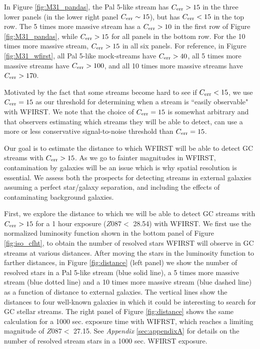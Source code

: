 \documentclass[twocolumn]{aastex62}
\begin{document}
In Figure \ref{fig:M31_pandas}, the Pal 5-like stream has $C_{\rm err} > 15$ in the three lower panels (in the lower right panel $C_{\rm err} \sim 15$), but has $C_{\rm err} <15$ in the top row. The 5 times more massive stream has a $C_{\rm err} > 10$ in the first row of Figure \ref{fig:M31_pandas}, while $C_{\rm err} > 15$ for all panels in the bottom row. For the 10 times more massive stream, $C_{\rm err} > 15$ in all six panels. For reference, in Figure \ref{fig:M31_wfirst}, all Pal 5-like mock-streams have $C_{\rm err} > 40$, all 5 times more massive streams have $C_{\rm err} > 100$, and all 10 times more massive streams have $C_{\rm err} > 170$.

Motivated by the fact that some streams become hard to see if $C_{\rm err} < 15$, we use $C_{\rm err} = 15$ as our threshold for determining when a stream is ``easily observable" with WFIRST. We note that the choice of $C_{\rm err} = 15$ is somewhat arbitrary and that observers estimating which streams they will be able to detect, can use a more or less conservative signal-to-noise threshold than $C_{\rm err} = 15$. 

Our goal is to estimate the distance to which WFIRST will be able to detect GC streams with  $C_{\rm err} > 15$. As we go to fainter magnitudes in WFIRST, contamination by galaxies will be an issue which is why spatial resolution is essential. We assess both the prospects for detecting streams in external galaxies assuming a perfect star/galaxy separation, and including the effects of contaminating background galaxies.

First, we explore the distance to which we will be able to detect GC streams with  $C_{\rm err} > 15$ for a 1 hour exposure ($Z087 <$ 28.54) with WFIRST. We first use the normalized luminosity function shown in the bottom panel of Figure \ref{fig:iso_cfht}, to obtain the number of resolved stars WFIRST will observe in GC streams at various distances. After moving the stars in the luminosity function to farther distances, in Figure \ref{fig:distance} (left panel) we show the number of resolved stars in a Pal 5-like stream (blue solid line), a 5 times more massive stream (blue dotted line) and a 10 times more massive stream (blue dashed line) as a function of distance to external galaxies. The vertical lines show the distances to four well-known galaxies in which it could be interesting to search for GC stellar streams. The right panel of Figure \ref{fig:distance} shows the same calculation for a 1000 sec. exposure time with WIFRST, which reaches a limiting magnitude of $Z087 <$ 27.15. See {\it Appendix} \ref{sec:appendixA} for details on the number of resolved stream stars in a 1000 sec. WFIRST exposure. 
\end{document}
